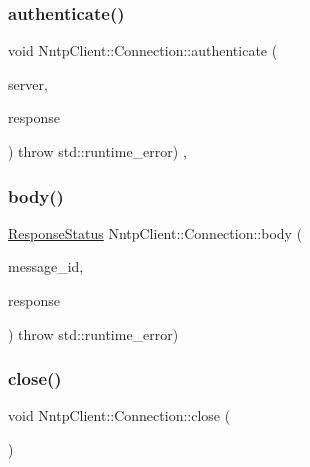\subsubsection{\texorpdfstring{authenticate()}{authenticate()}}
{\footnotesize\ttfamily void Nntp\+Client\+::\+Connection\+::authenticate (\begin{DoxyParamCaption}\item[{const \hyperlink{class_nntp_client_1_1_server_addr}{Server\+Addr} \&}]{server,  }\item[{\hyperlink{class_nntp_client_1_1_response}{Response} \&}]{response }\end{DoxyParamCaption}) throw  std\+::runtime\+\_\+error) \hspace{0.3cm}{\ttfamily [protected]}, {\ttfamily [virtual]}}

\hypertarget{class_nntp_client_1_1_connection_a1665cd7d2bdb1960222f2935ecf26e8f}{}\label{class_nntp_client_1_1_connection_a1665cd7d2bdb1960222f2935ecf26e8f} 
\subsubsection{\texorpdfstring{body()}{body()}}
{\footnotesize\ttfamily \hyperlink{namespace_nntp_client_a920c73a4038b2a2c307245b909b43203}{Response\+Status} Nntp\+Client\+::\+Connection\+::body (\begin{DoxyParamCaption}\item[{const char $\ast$}]{message\+\_\+id,  }\item[{\hyperlink{class_nntp_client_1_1_response}{Response} \&}]{response }\end{DoxyParamCaption}) throw  std\+::runtime\+\_\+error) }

\hypertarget{class_nntp_client_1_1_connection_ac2e2693bf8693a71f8bcade6cc57dbfb}{}\label{class_nntp_client_1_1_connection_ac2e2693bf8693a71f8bcade6cc57dbfb} 
\subsubsection{\texorpdfstring{close()}{close()}}
{\footnotesize\ttfamily void Nntp\+Client\+::\+Connection\+::close (\begin{DoxyParamCaption}{ }\end{DoxyParamCaption})\hspace{0.3cm}{\ttfamily [virtual]}}

